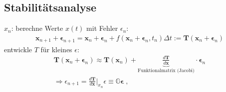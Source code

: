 \documentclass[12pt]{article}
\begin{document}
\subsection{Stabilitätsanalyse}
$x_n$: berechne Werte $x(t)$ mit Fehler $\epsilon_n$:
\begin{align}
\mathbf{x}_{n+1} + \mathbf{\epsilon}_{n+1} =\mathbf{x}_n + \mathbf{\epsilon}_n + f( \mathbf{x}_n + \mathbf{\epsilon}_n, t_n) \Delta t := \mathbf{T}(\mathbf{x}_n + \mathbf{\epsilon}_n)
\end{align} %
 entwickle $T$ für kleines $\epsilon$: 
 \begin{align}
 \mathbf{T}(\mathbf{x}_n + \mathbf{\epsilon}_n) 
 \approx \mathbf{T}(\mathbf{x}_n) + \underbrace{\frac{d\mathbf{T}}{d\mathbf{x}}}_\text{Funktionalmatrix (Jacobi)} \cdot \mathbf{\epsilon}_n \\
 \Rightarrow \epsilon_{n+1} = \frac{d\mathbf{T}}{d\mathbf{x}} \vert _{x_n} \epsilon \equiv \mathbb{G} \mathbf{\epsilon} \; ,
 \end{align}
 
\end{document}
